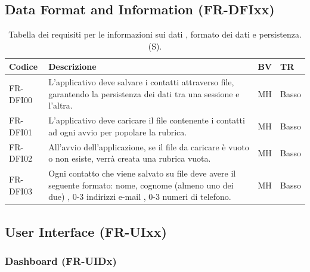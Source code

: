 \documentclass[a4paper,12pt]{article}
\begin{document}
    \subsection{Data Format and Information (FR-DFIxx)}
    \begin{table}[H]
        \centering
        \begin{tabular}{|l|p{8cm}|l|l|}
            \hline
            \textbf{Codice} & \textbf{Descrizione} & \textbf{BV} & \textbf{TR} \\
            \hline
            FR-DFI00 & L'applicativo deve salvare i contatti attraverso file, garantendo la persistenza dei dati tra una sessione e l'altra. & MH & Basso \\
            \hline
            FR-DFI01 & L'applicativo deve caricare il file contenente i contatti ad ogni avvio per popolare la rubrica. & MH & Basso \\
            \hline
            FR-DFI02 & All'avvio dell'applicazione, se il file da caricare è vuoto o non esiste, verrà creata una rubrica vuota. & MH & Basso \\
            \hline
            FR-DFI03 & Ogni contatto che viene salvato su file deve avere il seguente formato: nome, cognome (almeno uno dei due) , 0-3 indirizzi e-mail , 0-3 numeri di telefono. & MH & Basso \\
            \hline
        \end{tabular}
        \caption{Tabella dei requisiti per le informazioni sui dati , formato dei dati e persistenza. (S).}
    \end{table}
    \subsection{User Interface (FR-UIxx)}
    \subsubsection{Dashboard (FR-UIDx)}
\end{document}
